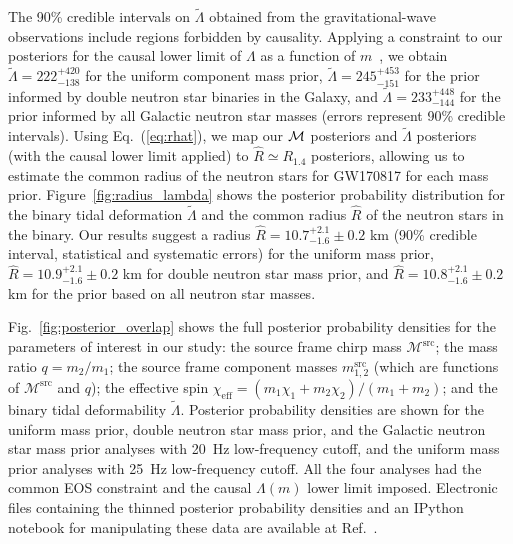 The 90\% credible intervals on $\tilde{\Lambda}$ obtained from the gravitational-wave observations include regions forbidden by causality. Applying a constraint to our posteriors for the causal lower limit of $\Lambda$ as a function of $m$~\cite{Zhao:2018nyf}, we obtain $\tilde{\Lambda}=
222^{+420}_{-138}$ for the uniform component mass prior, $\tilde{\Lambda}=245^{+453}_{-151}$ for the prior informed by double neutron star binaries in the Galaxy, and $\tilde{\Lambda}=233^{+448}_{-144}$ for the prior informed by all Galactic neutron star masses (errors represent 90\% credible intervals). Using Eq.~(\ref{eq:rhat}), we map our $\cal{M}$ posteriors and $\tilde{\Lambda}$ posteriors (with the causal lower limit applied) to $\hat{R} \simeq R_{1.4}$ posteriors, allowing us to estimate the common radius of the neutron stars for GW170817 for each mass prior. Figure~\ref{fig:radius_lambda} shows the posterior probability distribution for the binary tidal deformation $\tilde\Lambda$ and the common radius $\hat{R}$ of the neutron stars in the binary. Our results suggest a radius $\hat R = 10.7^{+2.1}_{-1.6} \pm 0.2$ km (90\% credible interval, statistical and systematic errors) for the uniform mass prior,  $\hat R = 10.9^{+2.1}_{-1.6} \pm 0.2$ km for double neutron star mass prior, and $\hat R = 10.8^{+2.1}_{-1.6} \pm 0.2$ km for the prior based on all neutron star masses.


Fig.~\ref{fig:posterior_overlap} shows the full posterior probability densities for the parameters of interest in our study: the source frame chirp mass $\mathcal{M}^\mathrm{src}$; the mass ratio $q=m_2/m_1$; the source frame component masses $m_{1,2}^\mathrm{src}$ (which are functions of $\mathcal{M}^\mathrm{src}$ and $q$); the effective spin $\chi_\mathrm{eff} = (m_1 \chi_1 + m_2 \chi_2) / (m_1 + m_2)$; and the binary tidal deformability $\tilde{\Lambda}$. Posterior probability densities are shown for the uniform mass prior, double neutron star mass prior, and the Galactic neutron star mass prior analyses with 20~Hz low-frequency cutoff, and the uniform mass prior analyses with 25~Hz low-frequency cutoff. All the four analyses had the common EOS constraint and the causal $\Lambda(m)$ lower limit imposed. Electronic files containing the thinned posterior probability densities and an IPython notebook \cite{PER-GRA:2007} for manipulating these data are available at Ref.~\cite{gw170817commoneos}.

